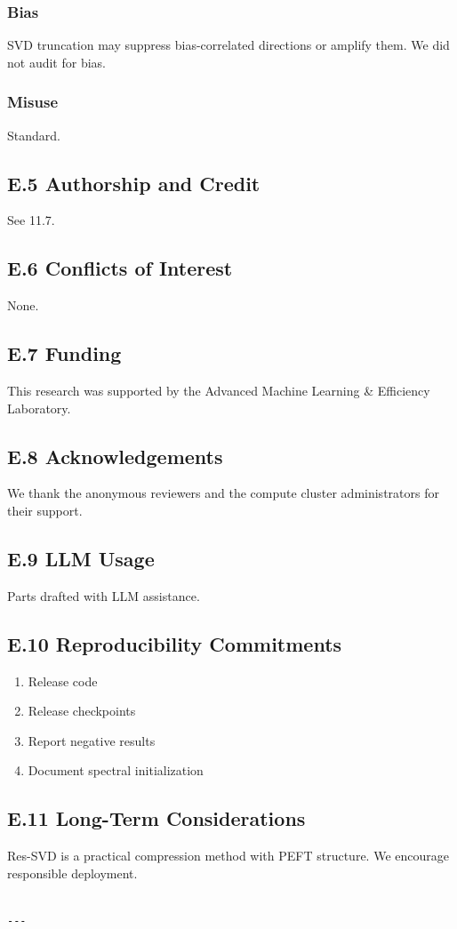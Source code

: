 \subsubsection{Bias}

SVD truncation may suppress bias-correlated directions or amplify them. 
We did not audit for bias.

\subsubsection{Misuse}

Standard.

\subsection{E.5 Authorship and Credit}

See  11.7.

\subsection{E.6 Conflicts of Interest}

None.

\subsection{E.7 Funding}

This research was supported by the Advanced Machine Learning \& Efficiency Laboratory.

\subsection{E.8 Acknowledgements}

We thank the anonymous reviewers and the compute cluster administrators for their support.

\subsection{E.9 LLM Usage}

Parts drafted with LLM assistance.

\subsection{E.10 Reproducibility Commitments}

\begin{enumerate}
\item Release code
\item Release checkpoints
\item Report negative results
\item Document spectral initialization

\end{enumerate}
\subsection{E.11 Long-Term Considerations}

Res-SVD is a practical compression method with PEFT structure. We 
encourage responsible deployment.
\begin{lstlisting}

---
\end{lstlisting}
